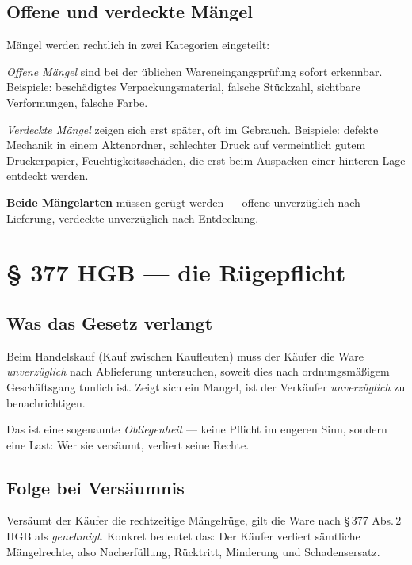 \documentclass[11pt, a4paper]{article}
\begin{document}
\subsection{Offene und verdeckte Mängel}

Mängel werden rechtlich in zwei Kategorien eingeteilt:

\emph{Offene Mängel} sind bei der üblichen Wareneingangs­prüfung sofort erkennbar.
Beispiele: beschädigtes Verpackungs­material, falsche Stückzahl, sichtbare Verformungen,
falsche Farbe.

\emph{Verdeckte Mängel} zeigen sich erst später, oft im Gebrauch. Beispiele: defekte
Mechanik in einem Aktenordner, schlechter Druck auf vermeintlich gutem Druckerpapier,
Feuchtigkeitsschäden, die erst beim Auspacken einer hinteren Lage entdeckt werden.

\textbf{Beide Mängelarten} müssen gerügt werden --- offene unverzüglich nach Lieferung,
verdeckte unverzüglich nach Entdeckung.

\section{§ 377 HGB --- die Rügepflicht}

\subsection{Was das Gesetz verlangt}

\begin{merksatz}[title={§ 377 HGB im Wortlaut (sinngemäß)}]
Beim Handelskauf (Kauf zwischen Kaufleuten) muss der Käufer die Ware \emph{unverzüglich}
nach Ablieferung untersuchen, soweit dies nach ordnungsmäßigem Geschäftsgang tunlich ist.
Zeigt sich ein Mangel, ist der Verkäufer \emph{unverzüglich} zu benachrichtigen.
\end{merksatz}

Das ist eine sogenannte \emph{Obliegenheit} --- keine Pflicht im engeren Sinn, sondern
eine Last: Wer sie versäumt, verliert seine Rechte.

\subsection{Folge bei Versäumnis}

Versäumt der Käufer die rechtzeitige Mängelrüge, gilt die Ware nach §\,377 Abs.\,2 HGB
als \emph{genehmigt}. Konkret bedeutet das: Der Käufer verliert sämtliche Mängelrechte,
also Nacherfüllung, Rücktritt, Minderung und Schadensersatz.
\end{document}
